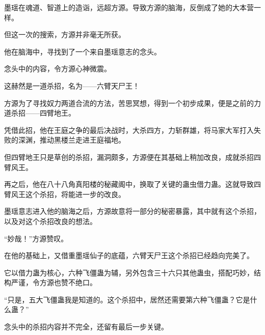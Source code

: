 \begin{this_body}
墨瑶在魂道、智道上的造诣，远超方源。导致方源的脑海，反倒成了她的大本营一样。

但这一次的搜索，方源并非毫无所获。

他在脑海中，寻找到了一个来自墨瑶意志的念头。

念头中的内容，令方源心神微震。

这赫然是一道杀招，名为——六臂天尸王！

方源为了寻找奴力两道合流的方法，苦思冥想，得到一个初步成果，便是之前的力道杀招——四臂地王。

凭借此招，他在王庭之争的最后决战时，大杀四方，力斩群雄，将马家大军打入失败的深渊，推动黑楼兰走进王庭福地。

但四臂地王只是草创的杀招，漏洞颇多，方源便在其基础上稍加改良，成就杀招四臂风王。

再之后，他在八十八角真阳楼的秘藏阁中，换取了关键的蛊虫借力蛊。这就导致四臂风王这个杀招，将能进一步的改良。

墨瑶意志进入他的脑海之后，方源故意将一部分的秘密暴露，其中就有这个杀招，以及对这个杀招改良的想法。

“妙哉！”方源赞叹。

在他的基础上，又借重墨瑶仙子的底蕴，六臂天尸王这个杀招已经趋向完美了。

它以借力蛊为核心，六种飞僵蛊为辅，另外包含三十六只其他蛊虫，搭配巧妙，结构严谨，令方源也赞不绝口。

“只是，五大飞僵蛊我是知道的。这个杀招中，居然还需要第六种飞僵蛊？它是什么蛊？”

念头中的杀招内容并不完全，还留有最后一步关键。

\end{this_body}

